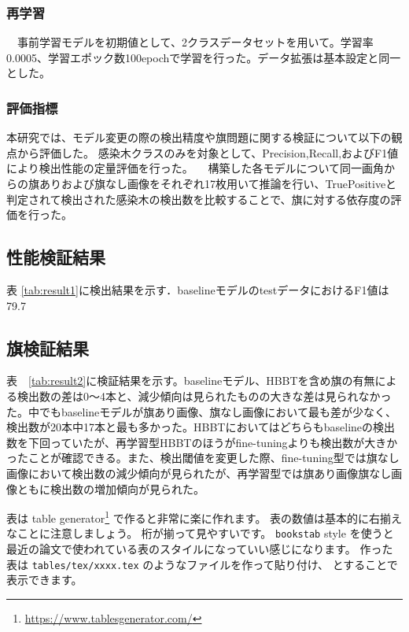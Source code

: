 \subsubsection{再学習}
　事前学習モデルを初期値として、2クラスデータセットを用いて。学習率0.0005、学習エポック数100epochで学習を行った。データ拡張は基本設定と同一とした。

\subsubsection{評価指標}
 本研究では、モデル変更の際の検出精度や旗問題に関する検証について以下の観点から評価した。
 感染木クラスのみを対象として、Precision,Recall,およびF1値により検出性能の定量評価を行った。
　構築した各モデルについて同一画角からの旗ありおよび旗なし画像をそれぞれ17枚用いて推論を行い、TruePositiveと判定されて検出された感染木の検出数を比較することで、旗に対する依存度の評価を行った。



\subsection{性能検証結果}
表 \ref{tab:result1}に検出結果を示す．baselineモデルのtestデータにおけるF1値は79.7%

\subsection{旗検証結果}
表　\ref{tab:result2}に検証結果を示す。baselineモデル、HBBTを含め旗の有無による検出数の差は0～4本と、減少傾向は見られたものの大きな差は見られなかった。中でもbaselineモデルが旗あり画像、旗なし画像において最も差が少なく、検出数が20本中17本と最も多かった。HBBTにおいてはどちらもbaselineの検出数を下回っていたが、再学習型HBBTのほうがfine-tuningよりも検出数が大きかったことが確認できる。また、検出閾値を変更した際、fine-tuning型では旗なし画像において検出数の減少傾向が見られたが、再学習型では旗あり画像旗なし画像ともに検出数の増加傾向が見られた。







    表は table generator\footnote{\url{https://www.tablesgenerator.com/}} で作ると非常に楽に作れます。
表の数値は基本的に右揃えなことに注意しましょう。
桁が揃って見やすいです。
\texttt{bookstab} style を使うと最近の論文で使われている表のスタイルになっていい感じになります。
作った表は \texttt{tables/tex/xxxx.tex} のようなファイルを作って貼り付け、\verb|| とすることで表示できます。
    

